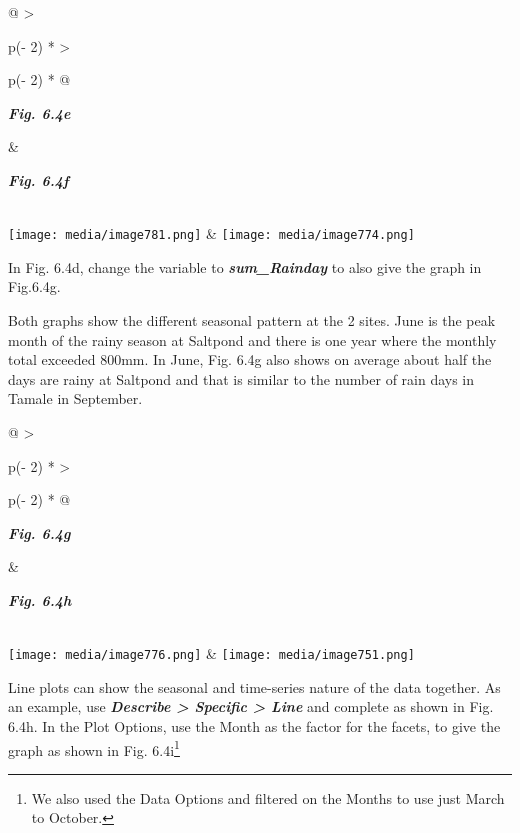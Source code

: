 \documentclass[
  letterpaper,
  DIV=11,
  numbers=noendperiod]{scrreprt}
\begin{document}
\begin{longtable}[]{@{}
  >{\raggedright\arraybackslash}p{(\columnwidth - 2\tabcolsep) * }
  >{\raggedright\arraybackslash}p{(\columnwidth - 2\tabcolsep) * }@{}}
\toprule\noalign{}
\begin{minipage}[b]{\linewidth}\raggedright
\textbf{\emph{Fig. 6.4e}}
\end{minipage} & \begin{minipage}[b]{\linewidth}\raggedright
\textbf{\emph{Fig. 6.4f}}
\end{minipage} \\
\midrule\noalign{}
\endhead
\bottomrule\noalign{}
\endlastfoot
\texttt{[image: media/image781.png]} &
\texttt{[image: media/image774.png]} \\
\end{longtable}

In Fig. 6.4d, change the variable to \textbf{\emph{sum\_Rainday}} to
also give the graph in Fig.6.4g.

Both graphs show the different seasonal pattern at the 2 sites. June is
the peak month of the rainy season at Saltpond and there is one year
where the monthly total exceeded 800mm. In June, Fig. 6.4g also shows on
average about half the days are rainy at Saltpond and that is similar to
the number of rain days in Tamale in September.

\begin{longtable}[]{@{}
  >{\raggedright\arraybackslash}p{(\columnwidth - 2\tabcolsep) * }
  >{\raggedright\arraybackslash}p{(\columnwidth - 2\tabcolsep) * }@{}}
\toprule\noalign{}
\begin{minipage}[b]{\linewidth}\raggedright
\textbf{\emph{Fig. 6.4g}}
\end{minipage} & \begin{minipage}[b]{\linewidth}\raggedright
\textbf{\emph{Fig. 6.4h}}
\end{minipage} \\
\midrule\noalign{}
\endhead
\bottomrule\noalign{}
\endlastfoot
\texttt{[image: media/image776.png]} &
\texttt{[image: media/image751.png]} \\
\end{longtable}

Line plots can show the seasonal and time-series nature of the data
together. As an example, use \textbf{\emph{Describe \textgreater{}
Specific \textgreater{} Line}} and complete as shown in Fig. 6.4h. In
the Plot Options, use the Month as the factor for the facets, to give
the graph as shown in Fig. 6.4i\footnote{We also used the Data Options
  and filtered on the Months to use just March to October.}
\end{document}
